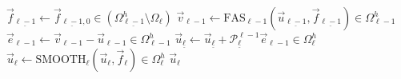 \documentclass{article}
\begin{document}
\begin{algorithm}
\begin{algorithmic}
    \State $\vec{f}_{\underline{\ell-1}} \gets \vec{f}_{\underline{\ell - 1},0} \in (\Omega^h_{\underline{\ell - 1}} \setminus \Omega_\ell)$ 
    \State $\vec{v}_{\ell - 1} \gets \textrm{FAS}_{\ell - 1}(\vec{u}_{\underline{\ell-1}}, \vec{f}_{\underline{\ell - 1}}) \in \Omega^h_{\ell - 1}$
    \State $\vec{e}_{\ell - 1} \gets \vec{v}_{\ell - 1} - \vec{u}_{\ell - 1} \in \Omega^h_{\ell - 1}$ 
    \State $\vec{u}_{\underline \ell} \gets \vec{u}_{\underline \ell} + \mathcal{P}^{\ell-1}_{\underline \ell} \vec{e}_{\ell - 1} \in \Omega^h_\ell $
    \State $\vec{u}_\ell \gets \text{SMOOTH}_\ell(\vec{u}_\ell, \vec{f}_\ell) \in \Omega^h_\ell$
    \State \Return $\vec{u}_\ell$
\EndProcedure 
\end{algorithmic} 
\end{algorithm}
\end{document}
